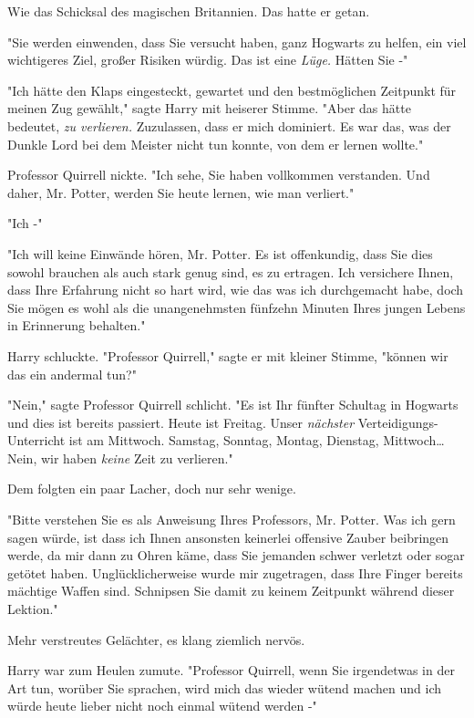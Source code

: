 {Wie das Schicksal des magischen Britannien. Das hatte er getan.

"Sie werden einwenden, dass Sie versucht haben, ganz Hogwarts zu helfen, ein viel wichtigeres Ziel, großer Risiken würdig. Das ist eine \emph{Lüge.} Hätten Sie -"

"Ich hätte den Klaps eingesteckt, gewartet und den bestmöglichen Zeitpunkt für meinen Zug gewählt," sagte Harry mit heiserer Stimme. "Aber das hätte bedeutet, \emph{zu verlieren.} Zuzulassen, dass er mich dominiert. Es war das, was der Dunkle Lord bei dem Meister nicht tun konnte, von dem er lernen wollte."

Professor Quirrell nickte. "Ich sehe, Sie haben vollkommen verstanden. Und daher, Mr. Potter, werden Sie heute lernen, wie man verliert."

"Ich -"

"Ich will keine Einwände hören, Mr. Potter. Es ist offenkundig, dass Sie dies sowohl brauchen als auch stark genug sind, es zu ertragen. Ich versichere Ihnen, dass Ihre Erfahrung nicht so hart wird, wie das was ich durchgemacht habe, doch Sie mögen es wohl als die unangenehmsten fünfzehn Minuten Ihres jungen Lebens in Erinnerung behalten."

Harry schluckte. "Professor Quirrell," sagte er mit kleiner Stimme, "können wir das ein andermal tun?"

"Nein," sagte Professor Quirrell schlicht. "Es ist Ihr fünfter Schultag in Hogwarts und dies ist bereits passiert. Heute ist Freitag. Unser \emph{nächster} Verteidigungs-Unterricht ist am Mittwoch. Samstag, Sonntag, Montag, Dienstag, Mittwoch… Nein, wir haben \emph{keine} Zeit zu verlieren."

Dem folgten ein paar Lacher, doch nur sehr wenige.

"Bitte verstehen Sie es als Anweisung Ihres Professors, Mr. Potter. Was ich gern sagen würde, ist dass ich Ihnen ansonsten keinerlei offensive Zauber beibringen werde, da mir dann zu Ohren käme, dass Sie jemanden schwer verletzt oder sogar getötet haben. Unglücklicherweise wurde mir zugetragen, dass Ihre Finger bereits mächtige Waffen sind. Schnipsen Sie damit zu keinem Zeitpunkt während dieser Lektion."

Mehr verstreutes Gelächter, es klang ziemlich nervös.

Harry war zum Heulen zumute. "Professor Quirrell, wenn Sie irgendetwas in der Art tun, worüber Sie sprachen, wird mich das wieder wütend machen und ich würde heute lieber nicht noch einmal wütend werden -"

}
